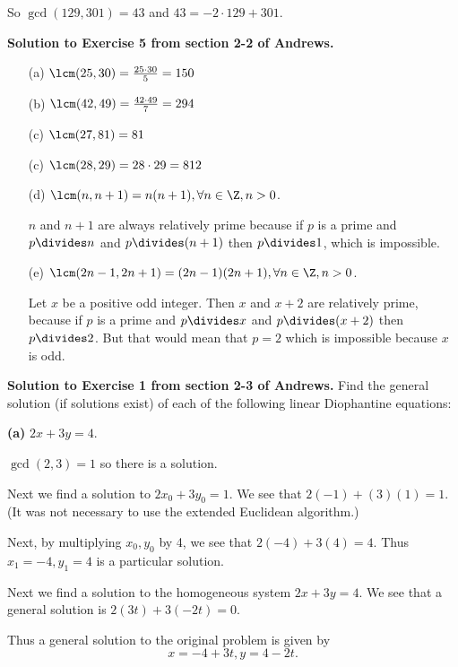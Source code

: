 \documentclass[oneside,12pt]{amsart}
\begin{document}
So $\gcd(129,301) = 43$ and $43 = -2\cdot 129 + 301$.


\bigskip

\textbf{Solution to Exercise 5 from section 2-2 of Andrews.} 

\begin{enumerate}
\item[(a)] $\lcm(25,30) = \frac{25\cdot 30}{5} = 150$
\item [(b)] $\lcm(42, 49) = \frac{42\cdot 49}{7} = 294$
\item [(c)] $\lcm(27,81) = 81$
\item [(c)] $\lcm(28,29) = 28\cdot 29 = 812$
\item [(d)] $\lcm(n,n+1) = n(n+1), \forall n\in \Z, n>0$.
\begin{subproof}
$n$ and $n+1$ are always relatively prime because if $p$ is a prime
and $p\divides n$ and $p\divides (n+1)$ then $p\divides 1$, which is
impossible.
\end{subproof}
\item [(e)] $\lcm(2n-1, 2n+1) = (2n-1)(2n+1), \forall n\in \Z, n>0$.
\begin{subproof}
Let $x$ be a positive odd integer. Then $x$ and $x+2$ are relatively prime,
because if $p$ is a prime and $p\divides x$ and $p\divides (x+2)$ then $p\divides 2$.
But that would mean that $p=2$ which is impossible because $x$ is odd.
\end{subproof}
\end{enumerate}

\bigskip

\textbf{Solution to Exercise 1 from section 2-3 of Andrews.} Find the general solution
(if solutions exist) of each of the following linear Diophantine equations:

\bigskip

\textbf{(a)} $2x + 3y = 4$.

\bigskip 

$\gcd(2,3)=1$ so there is a solution. 

Next we find a solution to $2x_0+3y_0 = 1$. We see that
$2(-1) + (3)(1) = 1$. (It was not necessary to use the extended Euclidean algorithm.)

Next, by multiplying $x_0, y_0$ by 4, we see that $2(-4) + 3(4) = 4$. 
Thus $x_1=-4, y_1=4$ is a particular solution.

Next we find a solution to the homogeneous system $2x+3y=4$. We see that
a general solution is $2(3t) + 3(-2t) = 0$.

Thus a general solution to the original problem is given by
$$x=-4 + 3t, y = 4 - 2t.$$
\end{document}
